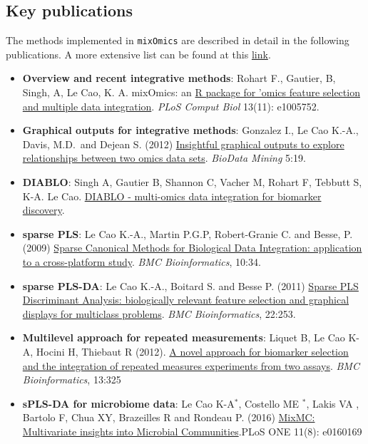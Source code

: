 \documentclass[
]{book}
\begin{document}
\hypertarget{01:pubs}{%
\subsection{Key publications}\label{01:pubs}}

The methods implemented in \texttt{mixOmics} are described in detail in the following publications. A more extensive list can be found at this \href{http://mixomics.org/a-propos/publications/}{link}.

\begin{itemize}
\item
  \textbf{Overview and recent integrative methods}: Rohart F., Gautier, B, Singh, A, Le Cao, K. A. mixOmics: an \href{http://journals.plos.org/ploscompbiol/article?id=10.1371/journal.pcbi.1005752}{R package for 'omics feature selection and multiple data integration}. \emph{PLoS Comput Biol} 13(11): e1005752.
\item
  \textbf{Graphical outputs for integrative methods}: \citep{Gon12} Gonzalez I., Le Cao K.-A., Davis, M.D.~and Dejean S. (2012) \href{https://biodatamining.biomedcentral.com/articles/10.1186/1756-0381-5-19}{Insightful graphical outputs to explore relationships between two omics data sets}. \emph{BioData Mining} 5:19.
\item
  \textbf{DIABLO}: Singh A, Gautier B, Shannon C, Vacher M, Rohart F, Tebbutt S, K-A. Le Cao. \href{https://www.biorxiv.org/content/early/2018/03/20/067611}{DIABLO - multi-omics data integration for biomarker discovery}.
\item
  \textbf{sparse PLS}: Le Cao K.-A., Martin P.G.P, Robert-Granie C. and Besse, P. (2009) \href{http://www.biomedcentral.com/1471-2105/10/34/}{Sparse Canonical Methods for Biological Data Integration: application to a cross-platform study}. \emph{BMC Bioinformatics}, 10:34.
\item
  \textbf{sparse PLS-DA}: Le Cao K.-A., Boitard S. and Besse P. (2011) \href{https://bmcbioinformatics.biomedcentral.com/articles/10.1186/1471-2105-12-253}{Sparse PLS Discriminant Analysis: biologically relevant feature selection and graphical displays for multiclass problems}. \emph{BMC Bioinformatics}, 22:253.
\item
  \textbf{Multilevel approach for repeated measurements}: Liquet B, Le Cao K-A, Hocini H, Thiebaut R (2012). \href{https://bmcbioinformatics.biomedcentral.com/articles/10.1186/1471-2105-13-325}{A novel approach for biomarker selection and the integration of repeated measures experiments from two assays}. \emph{BMC Bioinformatics}, 13:325
\item
  \textbf{sPLS-DA for microbiome data}: Le Cao K-A\(^*\), Costello ME \(^*\), Lakis VA , Bartolo F, Chua XY, Brazeilles R and Rondeau P. (2016) \href{http://journals.plos.org/plosone/article?id=10.1371/journal.pone.0160169}{MixMC: Multivariate insights into Microbial Communities}.PLoS ONE 11(8): e0160169
\end{itemize}
\end{document}
